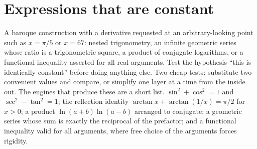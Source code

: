 \section{Expressions that are constant}

\cue A baroque construction with a derivative requested at an arbitrary-looking point such as $x=\pi/5$ or $x=67$: nested trigonometry, an infinite geometric series whose ratio is a trigonometric square, a product of conjugate logarithms, or a functional inequality asserted for all real arguments.
\method Test the hypothesis ``this is identically constant'' before doing anything else. Two cheap tests: substitute two convenient values and compare, or simplify one layer at a time from the inside out. The engines that produce these are a short list. $\sin^{2}+\cos^{2}=1$ and $\sec^{2}-\tan^{2}=1$; the reflection identity $\arctan x+\arctan(1/x)=\pi/2$ for $x>0$; a product $\ln(a+b)\ln(a-b)$ arranged to conjugate; a geometric series whose sum is exactly the reciprocal of the prefactor; and a functional inequality valid for all arguments, where free choice of the arguments forces rigidity.

